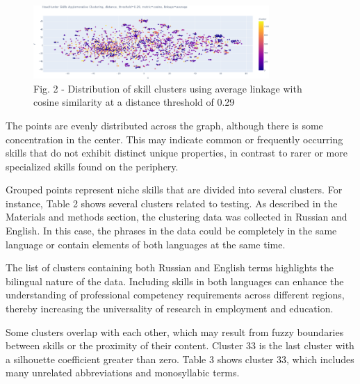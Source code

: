 \begin{figure}[H]
	\centering
	\includegraphics[width=0.8\textwidth]{media/ict/image105}
	\caption*{Fig. 2 - Distribution of skill clusters using average linkage
with cosine similarity at a distance threshold of 0.29}
\end{figure}

\begin{multicols}{2}
The points are evenly distributed across the graph, although there is
some concentration in the center. This may indicate common or frequently
occurring skills that do not exhibit distinct unique properties, in
contrast to rarer or more specialized skills found on the periphery.

Grouped points represent niche skills that are divided into several
clusters. For instance, Table 2 shows several clusters related to
testing. As described in the Materials and methods section, the
clustering data was collected in Russian and English. In this case, the
phrases in the data could be completely in the same language or contain
elements of both languages at the same time.

The list of clusters containing both Russian and English terms
highlights the bilingual nature of the data. Including skills in both
languages can enhance the understanding of professional competency
requirements across different regions, thereby increasing the
universality of research in employment and education.

Some clusters overlap with each other, which may result from fuzzy
boundaries between skills or the proximity of their content. Cluster 33
is the last cluster with a silhouette coefficient greater than zero.
Table 3 shows cluster 33, which includes many unrelated abbreviations
and monosyllabic terms.
\end{multicols}

